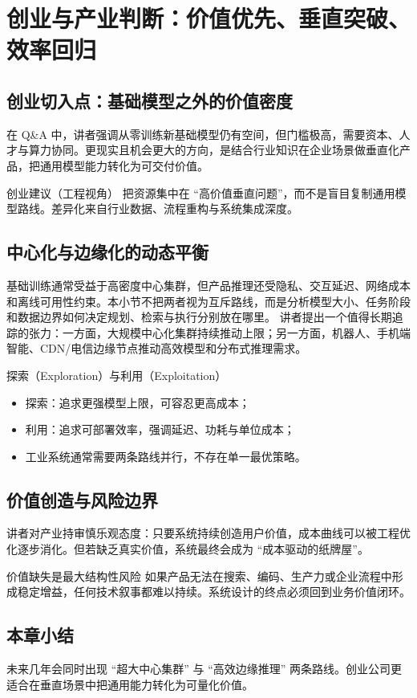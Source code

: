 \section{创业与产业判断：价值优先、垂直突破、效率回归}

\subsection{创业切入点：基础模型之外的价值密度}
在 Q\&A 中，讲者强调从零训练新基础模型仍有空间，但门槛极高，需要资本、人才与算力协同。更现实且机会更大的方向，是结合行业知识在企业场景做垂直化产品，把通用模型能力转化为可交付价值。

\begin{importantbox}{创业建议（工程视角）}
把资源集中在 ``高价值垂直问题''，而不是盲目复制通用模型路线。差异化来自行业数据、流程重构与系统集成深度。
\end{importantbox}

\subsection{中心化与边缘化的动态平衡}
基础训练通常受益于高密度中心集群，但产品推理还受隐私、交互延迟、网络成本和离线可用性约束。本小节不把两者视为互斥路线，而是分析模型大小、任务阶段和数据边界如何决定规划、检索与执行分别放在哪里。
讲者提出一个值得长期追踪的张力：一方面，大规模中心化集群持续推动上限；另一方面，机器人、手机端智能、CDN/电信边缘节点推动高效模型和分布式推理需求。

\begin{knowledgebox}{探索（Exploration）与利用（Exploitation）}
\begin{itemize}
    \item 探索：追求更强模型上限，可容忍更高成本；
    \item 利用：追求可部署效率，强调延迟、功耗与单位成本；
    \item 工业系统通常需要两条路线并行，不存在单一最优策略。
\end{itemize}
\end{knowledgebox}

\subsection{价值创造与风险边界}
讲者对产业持审慎乐观态度：只要系统持续创造用户价值，成本曲线可以被工程优化逐步消化。但若缺乏真实价值，系统最终会成为 ``成本驱动的纸牌屋''。

\begin{warningbox}{价值缺失是最大结构性风险}
如果产品无法在搜索、编码、生产力或企业流程中形成稳定增益，任何技术叙事都难以持续。系统设计的终点必须回到业务价值闭环。
\end{warningbox}

\subsection{本章小结}
未来几年会同时出现 ``超大中心集群'' 与 ``高效边缘推理'' 两条路线。创业公司更适合在垂直场景中把通用能力转化为可量化价值。

